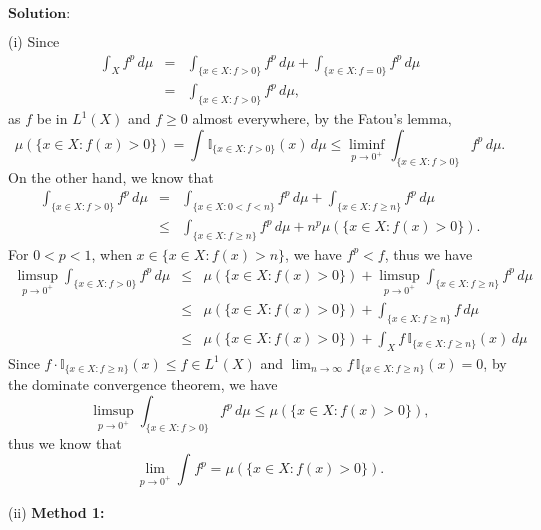 \documentclass[12pt,a4paper]{ctexart}
\begin{document}
\vspace{8pt}
$\textbf{Solution:}$

(i) Since
\begin{eqnarray*}
    \int_{X}^{} f^{p} \, d \mu & = & \int_{\{x \in X: f > 0\}}^{} f^{p} \, d \mu + \int_{\{x \in X: f = 0\}}^{} f^{p} \, d \mu \\
    & = & \int_{\{x \in X: f > 0\}}^{} f^{p} \, d \mu,
\end{eqnarray*}
as $f$ be in $L^{1}(X)$ and $f \geq 0$ almost everywhere, by the Fatou's lemma,
\begin{equation*}
    \mu(\{x \in X:  f(x) > 0\}) = \int_{}^{} \mathbb{I}_{\{x \in X: f > 0\}} (x) \, d \mu \leq \liminf_{p \to 0^{+}} \int_{\{x \in X: f > 0\}}^{} f^{p} \, d \mu.
\end{equation*}
On the other hand, we know that
\begin{eqnarray*}
    \int_{\{x \in X: f > 0\}}^{} f^{p} \, d \mu & = & \int_{\{x \in X: 0 < f < n\}}^{} f^{p} \, d \mu  + \int_{\{x \in X: f \geq n\}}^{} f^{p} \, d \mu \\
    & \leq & \int_{\{x \in X: f \geq n\}}^{} f^{p} \, d \mu + n^{p} \mu(\{x \in X:  f(x) > 0\}).
\end{eqnarray*}
For $0 < p < 1$, when $x \in \{x \in X:  f(x) > n\}$, we have $f^{p} < f$, thus we have
\begin{eqnarray*}
    \limsup_{p \to 0^{+}} \int_{\{x \in X: f > 0\}}^{} f^{p} \, d \mu & \leq &  \mu(\{x \in X:  f(x) > 0\}) + \limsup_{p \to 0^{+}} \int_{\{x \in X: f \geq n\}}^{} f^{p} \, d \mu \\
    & \leq & \mu(\{x \in X:  f(x) > 0\}) + \int_{\{x \in X: f \geq n\}}^{} f \, d \mu \\
    & \leq & \mu(\{x \in X:  f(x) > 0\}) + \int_{X}^{} f \, \mathbb{I}_{\{x \in X: f \geq n\}}(x) \, d \mu
\end{eqnarray*}
Since $f \cdot \mathbb{I}_{\{x \in X: f \geq n\}}(x) \leq f \in L^{1}(X)$ and $\lim_{n \to \infty} f \, \mathbb{I}_{\{x \in X: f \geq n\}}(x) = 0 $, by the dominate convergence theorem, we have
\begin{equation*}
    \limsup_{p \to 0^{+}} \int_{\{x \in X: f > 0\}}^{} f^{p} \, d \mu \leq \mu(\{x \in X:  f(x) > 0\}),
\end{equation*}
thus we know that
\begin{equation*}
    \lim_{p \to 0^{+}} \int_{}^{} f^{p} = \mu(\{x \in X:  f(x) > 0\}).
\end{equation*}

(ii) 
\textbf{Method 1:}
\end{document}
